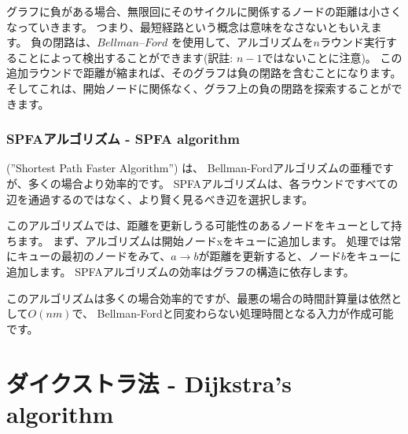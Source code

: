 グラフに負がある場合、無限回にそのサイクルに関係するノードの距離は小さくなっていきます。
つまり、最短経路という概念は意味をなさないともいえます。
負の閉路は、$Bellman–Ford$ を使用して、アルゴリズムを$n$ラウンド実行することによって検出することができます(訳註: $n-1$ではないことに注意)。
この追加ラウンドで距離が縮まれば、そのグラフは負の閉路を含むことになります。
そしてこれは、開始ノードに関係なく、グラフ上の負の閉路を探索することができます。

\subsubsection{SPFAアルゴリズム - SPFA algorithm}


 (''Shortest Path Faster Algorithm'') \cite{fan94}は、
Bellman-Fordアルゴリズムの亜種ですが、多くの場合より効率的です。
SPFAアルゴリズムは、各ラウンドですべての辺を通過するのではなく、より賢く見るべき辺を選択します。

このアルゴリズムでは、距離を更新しうる可能性のあるノードをキューとして持ちます。
まず、アルゴリズムは開始ノードxをキューに追加します。
処理では常にキューの最初のノードをみて、$a \rightarrow b$が距離を更新すると、ノード$b$をキューに追加します。
SPFAアルゴリズムの効率はグラフの構造に依存します。


%
%

このアルゴリズムは多くの場合効率的ですが、最悪の場合の時間計算量は依然として$O(nm)$で、
Bellman-Fordと同変わらない処理時間となる入力が作成可能です。

\section{ダイクストラ法 - Dijkstra's algorithm}

